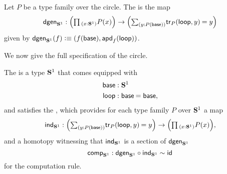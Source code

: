 \begin{defn}
Let $P$ be a type family over the circle. The  is the map
\begin{equation}\label{eq:dgen_circle}
\dgen_{\sphere{1}}:\Big(\prd{x:\sphere{1}}P(x)\Big)\to\Big(\sm{y:P(\base)}\id{\tr_P(\lloop,y)}{y}\Big)
\end{equation}
given by $\mathsf{dgen}_{\mathbf{S}^{1}}(f)\vcentcolon\equiv{\mathopen{}(f(\ensuremath{\mathsf{base}}),\ensuremath{\mathsf{apd}_{f}\mathopen{}\left(\mathsf{loop}\right)\mathclose{}})\mathclose{}}$.
\end{defn}

We now give the full specification of the circle.

\begin{defn}
The  is a type $\mathbf{S}^{1}$ that comes equipped with
\begin{align*}
\base & : \sphere{1} \\
\lloop & : \id{\base}{\base},
\end{align*}
and satisfies the , which provides for each type family $P$ over $\mathbf{S}^{1}$ a map
\begin{equation*}
\ind{\sphere{1}}:\Big(\sm{y:P(\base)}\id{\tr_P(\lloop,y)}{y}\Big)\to \Big(\prd{x:\sphere{1}}P(x)\Big),
\end{equation*}
and a homotopy witnessing that $\mathsf{ind}_{\mathbf{S}^{1}}$ is a section of $\mathsf{dgen}_{\mathbf{S}^{1}}$
\begin{equation*}
\mathsf{comp}_{\mathbf{S}^{1}}:\mathsf{dgen}_{\mathbf{S}^{1}}\circ \mathsf{ind}_{\mathbf{S}^{1}}\sim \mathsf{id}_{}
\end{equation*}
for the computation rule.
\end{defn}

